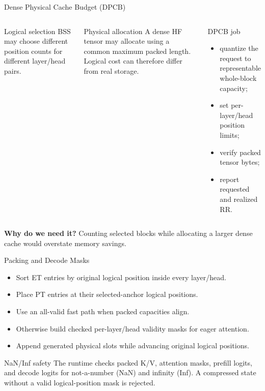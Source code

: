 \documentclass[aspectratio=169,10pt]{beamer}
\newcommand{\whylabel}{\textbf{Why do we need it?}}
\newcommand{\tightitems}{\setlength{\itemsep}{0.28em}\setlength{\parskip}{0pt}}
\begin{document}
\begin{frame}{Dense Physical Cache Budget (DPCB)}
\small
\begin{columns}[T,onlytextwidth]
\begin{block}{Logical selection}
BSS may choose different position counts for different layer/head pairs.
\end{block}
\begin{block}{Physical allocation}
A dense HF tensor may allocate using a common maximum packed length. Logical cost can therefore
differ from real storage.
\end{block}
\begin{exampleblock}{DPCB job}
\begin{itemize}\tightitems
  \item quantize the request to representable whole-block capacity;
  \item set per-layer/head position limits;
  \item verify packed tensor bytes;
  \item report requested and realized RR.
\end{itemize}
\end{exampleblock}
\end{columns}
\begin{alertblock}{\whylabel}
Counting selected blocks while allocating a larger dense cache would overstate memory savings.
\end{alertblock}
\end{frame}

\begin{frame}{Packing and Decode Masks}
\small
\begin{itemize}\tightitems
  \item Sort ET entries by original logical position inside every layer/head.
  \item Place PT entries at their selected-anchor logical positions.
  \item Use an all-valid fast path when packed capacities align.
  \item Otherwise build checked per-layer/head validity masks for eager attention.
  \item Append generated physical slots while advancing original logical positions.
\end{itemize}
\begin{alertblock}{NaN/Inf safety}
The runtime checks packed K/V, attention masks, prefill logits, and decode logits for not-a-number
(NaN) and infinity (Inf). A compressed state without a valid logical-position mask is rejected.
\end{alertblock}
\end{frame}
\end{document}
